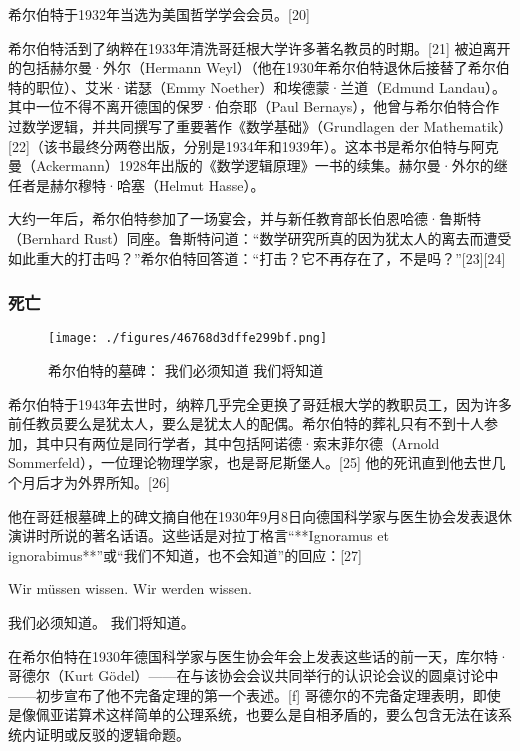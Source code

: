 希尔伯特于1932年当选为美国哲学学会会员。[20]

希尔伯特活到了纳粹在1933年清洗哥廷根大学许多著名教员的时期。[21] 被迫离开的包括赫尔曼·外尔（Hermann Weyl）（他在1930年希尔伯特退休后接替了希尔伯特的职位）、艾米·诺瑟（Emmy Noether）和埃德蒙·兰道（Edmund Landau）。其中一位不得不离开德国的保罗·伯奈耶（Paul Bernays），他曾与希尔伯特合作过数学逻辑，并共同撰写了重要著作《数学基础》（Grundlagen der Mathematik）[22]（该书最终分两卷出版，分别是1934年和1939年）。这本书是希尔伯特与阿克曼（Ackermann）1928年出版的《数学逻辑原理》一书的续集。赫尔曼·外尔的继任者是赫尔穆特·哈塞（Helmut Hasse）。

大约一年后，希尔伯特参加了一场宴会，并与新任教育部长伯恩哈德·鲁斯特（Bernhard Rust）同座。鲁斯特问道：“数学研究所真的因为犹太人的离去而遭受如此重大的打击吗？”希尔伯特回答道：“打击？它不再存在了，不是吗？”[23][24]
\subsubsection{死亡}
\begin{figure}[ht]
\centering
\texttt{[image: ./figures/46768d3dffe299bf.png]}
\caption{希尔伯特的墓碑： 我们必须知道  我们将知道} \label{fig_David_8}
\end{figure}
希尔伯特于1943年去世时，纳粹几乎完全更换了哥廷根大学的教职员工，因为许多前任教员要么是犹太人，要么是犹太人的配偶。希尔伯特的葬礼只有不到十人参加，其中只有两位是同行学者，其中包括阿诺德·索末菲尔德（Arnold Sommerfeld），一位理论物理学家，也是哥尼斯堡人。[25] 他的死讯直到他去世几个月后才为外界所知。[26]

他在哥廷根墓碑上的碑文摘自他在1930年9月8日向德国科学家与医生协会发表退休演讲时所说的著名话语。这些话是对拉丁格言“**Ignoramus et ignorabimus**”或“我们不知道，也不会知道”的回应：[27]

Wir müssen wissen.  
Wir werden wissen.

我们必须知道。  
我们将知道。

在希尔伯特在1930年德国科学家与医生协会年会上发表这些话的前一天，库尔特·哥德尔（Kurt Gödel）——在与该协会会议共同举行的认识论会议的圆桌讨论中——初步宣布了他不完备定理的第一个表述。[f] 哥德尔的不完备定理表明，即使是像佩亚诺算术这样简单的公理系统，也要么是自相矛盾的，要么包含无法在该系统内证明或反驳的逻辑命题。